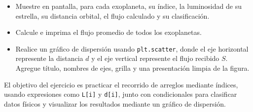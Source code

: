 \begin{tcolorbox}[colback=blue!2!white,colframe=blue!55!black,title={Enunciado},breakable]
\begin{itemize}
    \item[(e)] Muestre en pantalla, para cada exoplaneta, su índice, la luminosidad de su estrella, su distancia orbital, el flujo calculado y su clasificación.

    \item[(f)] Calcule e imprima el flujo promedio de todos los exoplanetas.

    \item[(g)] Realice un gráfico de dispersión usando \texttt{plt.scatter}, donde el eje horizontal represente la distancia $d$ y el eje vertical represente el flujo recibido $S$. Agregue título, nombres de ejes, grilla y una presentación limpia de la figura.
\end{itemize}

El objetivo del ejercicio es practicar el recorrido de arreglos mediante índices, usando expresiones como \texttt{L[i]} y \texttt{d[i]}, junto con condicionales para clasificar datos físicos y visualizar los resultados mediante un gráfico de dispersión.
\end{tcolorbox}

